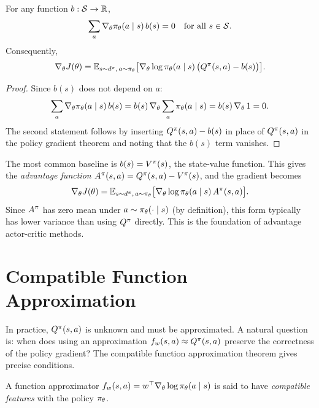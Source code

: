 \documentclass[11pt,a4paper]{article}
\begin{document}
\begin{proposition}
\label{prop:baseline}
For any function $b : \mathcal{S} \to \mathbb{R}$,
\[
  \sum_a \nabla_\theta \pi_\theta(a \mid s)\, b(s) = 0
  \quad \text{for all } s \in \mathcal{S}.
\]
Consequently,
\[
  \nabla_\theta J(\theta)
  = \mathbb{E}_{s \sim d^{\pi},\, a \sim \pi_\theta}
    \bigl[\nabla_\theta \log \pi_\theta(a \mid s)\,
    \bigl(Q^{\pi}(s,a) - b(s)\bigr)\bigr].
\]
\end{proposition}

\begin{proof}
Since $b(s)$ does not depend on $a$:
\[
  \sum_a \nabla_\theta \pi_\theta(a \mid s)\, b(s)
  = b(s)\, \nabla_\theta \sum_a \pi_\theta(a \mid s)
  = b(s)\, \nabla_\theta\, 1 = 0.
\]
The second statement follows by inserting
$Q^{\pi}(s,a) - b(s)$ in place of $Q^{\pi}(s,a)$ in the policy gradient
theorem and noting that the $b(s)$ term vanishes.
\end{proof}

\begin{rlconnection}
The most common baseline is $b(s) = V^{\pi}(s)$, the state-value function.
This gives the \emph{advantage function}
$A^{\pi}(s,a) = Q^{\pi}(s,a) - V^{\pi}(s)$, and the gradient becomes
\[
  \nabla_\theta J(\theta) = \mathbb{E}_{s \sim d^{\pi},\, a \sim \pi_\theta}
  \bigl[\nabla_\theta \log \pi_\theta(a \mid s)\, A^{\pi}(s,a)\bigr].
\]
Since $A^{\pi}$ has zero mean under $a \sim \pi_\theta(\cdot \mid s)$
(by definition), this form typically has lower variance than using
$Q^{\pi}$ directly. This is the foundation of advantage actor-critic methods.
\end{rlconnection}

\section{Compatible Function Approximation}

In practice, $Q^{\pi}(s,a)$ is unknown and must be approximated. A natural
question is: when does using an approximation $f_w(s,a) \approx Q^{\pi}(s,a)$
preserve the correctness of the policy gradient? The compatible function
approximation theorem gives precise conditions.

\begin{definition}
\label{def:compatible}
A function approximator $f_w(s,a) = w^\top \nabla_\theta \log
\pi_\theta(a \mid s)$ is said to have \emph{compatible features}
with the policy $\pi_\theta$.
\end{definition}
\end{document}
